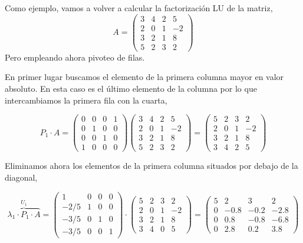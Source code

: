 Como ejemplo, vamos a volver a calcular la factorización LU de la matriz,
 \begin{equation*}
A=\begin{pmatrix}
3& 4& 2&5\\
2& 0& 1& -2\\
3& 2& 1& 8\\
5& 2& 3& 2
\end{pmatrix} 
\end{equation*}
 Pero empleando ahora pivoteo de filas.
 
En primer lugar buscamos  el elemento de la primera columna mayor en valor absoluto. En esta caso es el último elemento de la columna por lo que intercambiamos la primera fila con la cuarta,
 
 
  \begin{equation*}
P_1\cdot A=\begin{pmatrix}
0& 0& 0& 1\\
0& 1& 0& 0\\
0& 0&1& 0\\
1& 0& 0& 0
\end{pmatrix}\begin{pmatrix}
3& 4& 2&5\\
2& 0& 1& -2\\
3& 2& 1& 8\\
5& 2& 3& 2
\end{pmatrix}= \begin{pmatrix}
5& 2& 3& 2\\
2& 0& 1& -2\\
3& 2& 1& 8\\
3& 4& 2&5
\end{pmatrix}
\end{equation*}

Eliminamos ahora los elementos de la primera columna situados por debajo de la diagonal,

\begin{equation*}
\overbrace{\lambda_1 \cdot P_1\cdot A}^{U_1}=\begin{pmatrix}
1& 0& 0& 0\\
-2/5& 1& 0& 0\\
-3/5& 0& 1& 0\\
-3/5& 0& 0&1
\end{pmatrix} \cdot \begin{pmatrix}
5& 2& 3& 2\\
2& 0& 1& -2\\
3& 2& 1& 8\\
3& 4& 0&5
\end{pmatrix}= \begin{pmatrix}
5& 2& 3& 2\\
0& -0.8& -0.2& -2.8\\
0& 0.8& -0.8& -6.8\\
0& 2.8& 0.2&3.8
\end{pmatrix}
\end{equation*}

